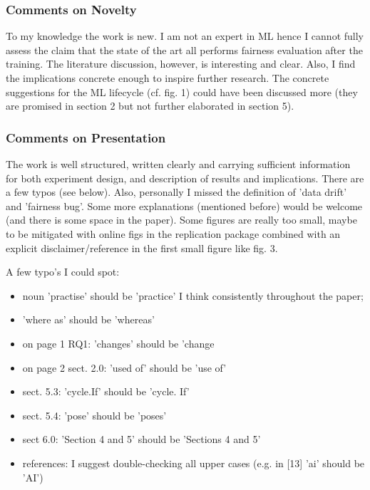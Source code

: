 \documentclass[conference]{IEEEtran}
\begin{document}
\subsubsection{Comments on Novelty}
To my knowledge the work is new. I am not an expert in ML hence
I cannot fully assess the claim that the state of the art all performs
fairness evaluation after the training. The literature discussion,
however, is interesting and clear. Also, I find the implications
concrete enough to inspire further research. The concrete suggestions
for the ML lifecycle (cf. fig. 1) could have been discussed more (they
are promised in section 2 but not further elaborated in section 5).



\subsubsection{Comments on Presentation}

The work is well structured, written clearly and carrying sufficient
information for both experiment design, and description of results and
implications. There are a few typos (see below). Also, personally
I missed the definition of 'data drift' and 'fairness bug'. Some more
explanations (mentioned before) would be welcome (and there is some
space in the paper). Some figures are really too small, maybe to be
mitigated with online figs in the replication package combined with an
explicit disclaimer/reference in the first small figure like fig. 3.

A few typo's I could spot:
\begin{itemize}
  \item noun 'practise' should be 'practice' I think consistently throughout the paper;
  \item 'where as' should be 'whereas'
  \item on page 1 RQ1: 'changes' should be 'change
  \item on page 2 sect. 2.0: 'used of' should be 'use of'
  \item sect. 5.3: 'cycle.If' should be 'cycle. If'
  \item sect. 5.4: 'pose' should be 'poses'
  \item sect 6.0: 'Section 4 and 5' should be 'Sections 4 and 5'
  \item references: I suggest double-checking all upper cases (e.g. in
    [13] 'ai' should be 'AI')
\end{itemize}
\end{document}
